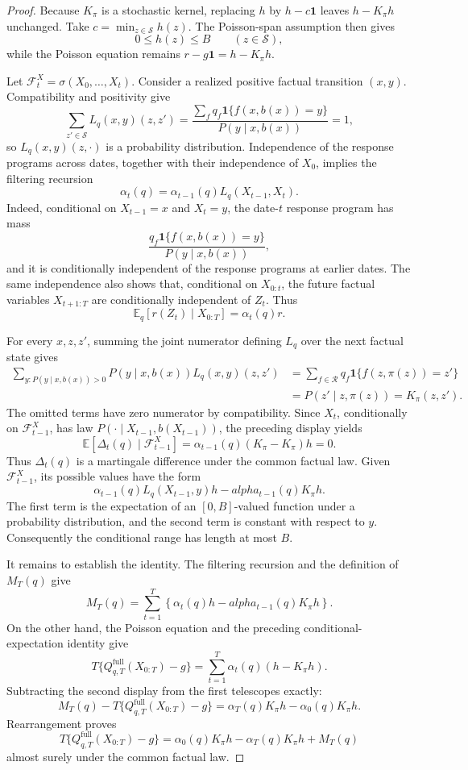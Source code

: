 \documentclass{article}
\begin{document}
\begin{proof}
Because \(K_{\pi}\) is a stochastic kernel, replacing \(h\) by \(h-c\mathbf 1\) leaves \(h-K_{\pi}h\) unchanged.  Take \(c=\min_{z\in\mathcal S}h(z)\).  The Poisson-span assumption then gives
\[
 0\le h(z)\le B\qquad(z\in\mathcal S),
\]
while the Poisson equation remains \(r-g\mathbf 1=h-K_{\pi}h\).

Let \(\mathcal F^X_t=\sigma(X_0,\ldots,X_t)\).  Consider a realized positive factual transition \((x,y)\).  Compatibility and positivity give
\[
 \sum_{z'\in\mathcal S}L_q(x,y)(z,z')
 =\frac{\sum_f q_f\mathbf 1\{f(x,b(x))=y\}}
 {P(y\mid x,b(x))}=1,
\]
so \(L_q(x,y)(z,\cdot)\) is a probability distribution.  Independence of the response programs across dates, together with their independence of \(X_0\), implies the filtering recursion
\[
 \alpha_t(q)=\alpha_{t-1}(q)L_q(X_{t-1},X_t).
\]
Indeed, conditional on \(X_{t-1}=x\) and \(X_t=y\), the date-\(t\) response program has mass
\[
 \frac{q_f\mathbf 1\{f(x,b(x))=y\}}{P(y\mid x,b(x))},
\]
and it is conditionally independent of the response programs at earlier dates.  The same independence also shows that, conditional on \(X_{0:t}\), the future factual variables \(X_{t+1:T}\) are conditionally independent of \(Z_t\).  Thus
\[
 \mathbb E_q[r(Z_t)\mid X_{0:T}]=\alpha_t(q)r.
\]

For every \(x,z,z'\), summing the joint numerator defining \(L_q\) over the next factual state gives
\[
\begin{aligned}
 \sum_{y:P(y\mid x,b(x))>0}P(y\mid x,b(x))L_q(x,y)(z,z')
 &=\sum_{f\in\mathcal R}q_f\mathbf 1\{f(z,\pi(z))=z'\}\\
 &=P(z'\mid z,\pi(z))=K_{\pi}(z,z').
\end{aligned}
\]
The omitted terms have zero numerator by compatibility.  Since \(X_t\), conditionally on \(\mathcal F^X_{t-1}\), has law \(P(\cdot\mid X_{t-1},b(X_{t-1}))\), the preceding display yields
\[
 \mathbb E[\Delta_t(q)\mid\mathcal F^X_{t-1}]
 =\alpha_{t-1}(q)(K_{\pi}-K_{\pi})h=0.
\]
Thus \(\Delta_t(q)\) is a martingale difference under the common factual law.  Given \(\mathcal F^X_{t-1}\), its possible values have the form
\[
 \alpha_{t-1}(q)L_q(X_{t-1},y)h-alpha_{t-1}(q)K_{\pi}h.
\]
The first term is the expectation of an \([0,B]\)-valued function under a probability distribution, and the second term is constant with respect to \(y\).  Consequently the conditional range has length at most \(B\).

It remains to establish the identity.  The filtering recursion and the definition of \(M_T(q)\) give
\[
 M_T(q)=\sum_{t=1}^T\left\{\alpha_t(q)h-alpha_{t-1}(q)K_{\pi}h\right\}.
\]
On the other hand, the Poisson equation and the preceding conditional-expectation identity give
\[
 T\{Q^{\mathrm{full}}_{q,T}(X_{0:T})-g\}
 =\sum_{t=1}^T\alpha_t(q)(h-K_{\pi}h).
\]
Subtracting the second display from the first telescopes exactly:
\[
 M_T(q)-T\{Q^{\mathrm{full}}_{q,T}(X_{0:T})-g\}
 =\alpha_T(q)K_{\pi}h-\alpha_0(q)K_{\pi}h.
\]
Rearrangement proves
\[
 T\{Q^{\mathrm{full}}_{q,T}(X_{0:T})-g\}
 =\alpha_0(q)K_{\pi}h-\alpha_T(q)K_{\pi}h+M_T(q)
\]
almost surely under the common factual law.
\end{proof}
\end{document}
